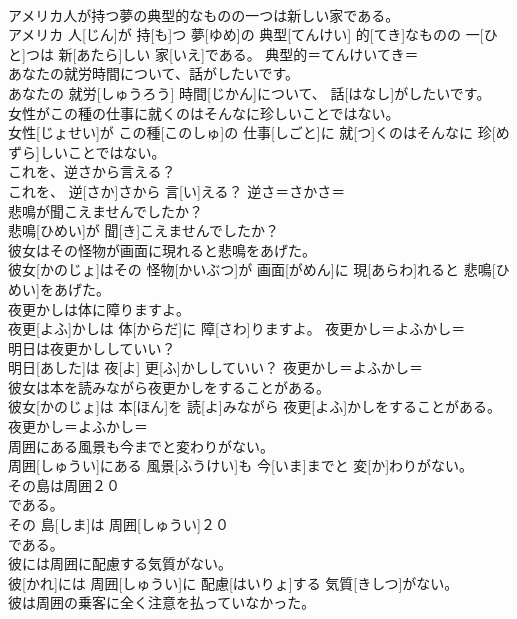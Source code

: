 \documentclass[8pt]{extreport}
\begin{document}
\begin{CJK}{UTF8}{min}
\\	アメリカ人が持つ夢の典型的なものの一つは新しい家である。	
\\	アメリカ 人[じん]が 持[も]つ 夢[ゆめ]の 典型[てんけい] 的[てき]なものの 一[ひと]つは 新[あたら]しい 家[いえ]である。	典型的＝てんけいてき＝ 
\\	あなたの就労時間について、話がしたいです。	
\\	あなたの 就労[しゅうろう] 時間[じかん]について、 話[はなし]がしたいです。	
\\	女性がこの種の仕事に就くのはそんなに珍しいことではない。	
\\	女性[じょせい]が この種[このしゅ]の 仕事[しごと]に 就[つ]くのはそんなに 珍[めずら]しいことではない。	
\\	これを、逆さから言える？	
\\	これを、 逆[さか]さから 言[い]える？	逆さ＝さかさ＝ 
\\	悲鳴が聞こえませんでしたか？	
\\	悲鳴[ひめい]が 聞[き]こえませんでしたか？	
\\	彼女はその怪物が画面に現れると悲鳴をあげた。	
\\	彼女[かのじょ]はその 怪物[かいぶつ]が 画面[がめん]に 現[あらわ]れると 悲鳴[ひめい]をあげた。	
\\	夜更かしは体に障りますよ。	
\\	夜更[よふ]かしは 体[からだ]に 障[さわ]りますよ。	夜更かし＝よふかし＝ 
\\	明日は夜更かししていい？	
\\	明日[あした]は 夜[よ] 更[ふ]かししていい？	夜更かし＝よふかし＝ 
\\	彼女は本を読みながら夜更かしをすることがある。	
\\	彼女[かのじょ]は 本[ほん]を 読[よ]みながら 夜更[よふ]かしをすることがある。	夜更かし＝よふかし＝ 
\\	周囲にある風景も今までと変わりがない。	
\\	周囲[しゅうい]にある 風景[ふうけい]も 今[いま]までと 変[か]わりがない。	
\\	その島は周囲２０
\\	である。	
\\	その 島[しま]は 周囲[しゅうい]２０ 
\\	である。	
\\	彼には周囲に配慮する気質がない。	
\\	彼[かれ]には 周囲[しゅうい]に 配慮[はいりょ]する 気質[きしつ]がない。	
\\	彼は周囲の乗客に全く注意を払っていなかった。	

\end{CJK}
\end{document}
